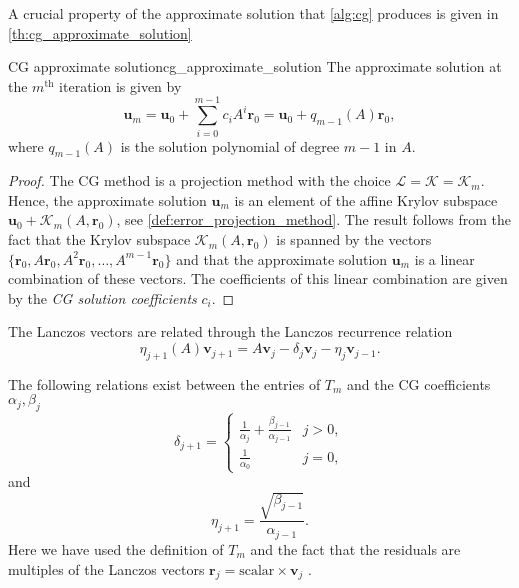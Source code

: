 A crucial property of the approximate solution that \cref{alg:cg} produces is given in \cref{th:cg_approximate_solution}
\begin{fancyth}{CG approximate solution}{cg_approximate_solution}
  The approximate solution at the $m^{\text{th}}$ iteration is given by
  \begin{equation}
    \mathbf{u}_m = \mathbf{u}_0 + \sum_{i=0}^{m-1} c_i A^i \mathbf{r}_0 = \mathbf{u}_0 + q_{m-1}(A)\mathbf{r}_0,
    \label{eq:cg_approximate_solution}
  \end{equation}
where $q_{m-1}(A)$ is the solution polynomial of degree $m-1$ in $A$.
\end{fancyth}
\begin{proof}
  The CG method is a projection method with the choice $\mathcal{L} = \mathcal{K} = \mathcal{K}_m$. Hence, the approximate solution $\mathbf{u}_m$ is an element of the affine Krylov subspace $\mathbf{u}_0 + \mathcal{K}_m(A, \mathbf{r}_0)$, see \cref{def:error_projection_method}. The result follows from the fact that the Krylov subspace $\mathcal{K}_m(A, \mathbf{r}_0)$ is spanned by the vectors $\{\mathbf{r}_0, A\mathbf{r}_0, A^2\mathbf{r}_0, \dots, A^{m-1}\mathbf{r}_0\}$ and that the approximate solution $\mathbf{u}_m$ is a linear combination of these vectors. The coefficients of this linear combination are given by the \textit{CG solution coefficients} $c_i$.
\end{proof}

The Lanczos vectors are related through the Lanczos recurrence relation
\begin{equation}
  \label{eq:lanczos_recurrence}
  \eta_{j+1}(A)\mathbf{v}_{j+1} = A \mathbf{v}_j - \delta_j \mathbf{v}_j - \eta_j \mathbf{v}_{j-1}.
\end{equation}

The following relations exist between the entries of $T_m$ and the CG coefficients $\alpha_j, \beta_j$
\begin{equation}
  \delta_{j+1} =
  \begin{cases}
    \frac{1}{\alpha_j} + \frac{\beta_{j-1}}{\alpha_{j-1}} & j > 0, \\
    \frac{1}{\alpha_0}                                    & j = 0,
  \end{cases}
  \label{eq:cg_hessenberg_delta}
\end{equation}
and
\begin{equation}
  \eta_{j+1} = \frac{\sqrt{\beta_{j-1}}}{\alpha_{j-1}}.
  \label{eq:cg_hessenberg_eta}
\end{equation}
Here we have used the definition of $T_m$ and the fact that the residuals are multiples of the Lanczos vectors $\mathbf{r}_j = \text{scalar} \times \mathbf{v}_j$ \cite[Equation 6.103]{iter_method_saad}.

